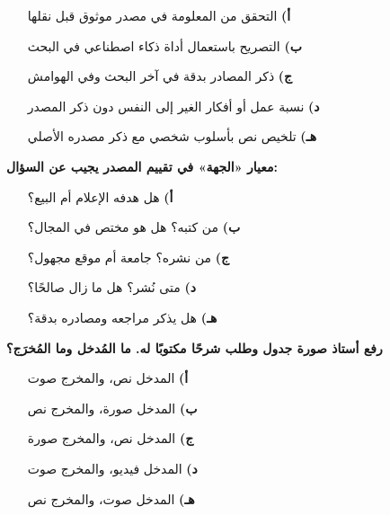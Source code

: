 \documentclass[11pt,a4paper]{article}
\begin{document}
\begin{multicols}{2}
\begin{minipage}{\linewidth}
\begin{itemize}[leftmargin=0.95cm, labelsep=4pt, itemsep=0pt, topsep=2pt, parsep=0pt]
  \item[\textbf{أ)}] التحقق من المعلومة في مصدر موثوق قبل نقلها
  \item[\textbf{ب)}] التصريح باستعمال أداة ذكاء اصطناعي في البحث
  \item[\textbf{ج)}] ذكر المصادر بدقة في آخر البحث وفي الهوامش
  \item[\textbf{د)}] نسبة عمل أو أفكار الغير إلى النفس دون ذكر المصدر
  \item[\textbf{هـ)}] تلخيص نص بأسلوب شخصي مع ذكر مصدره الأصلي
\end{itemize}
\end{minipage}\par\vspace{7pt plus 4pt}
\noindent\begin{minipage}{\linewidth}
\hangindent=0.7cm\textbf{معيار «الجهة» في تقييم المصدر يجيب عن السؤال:}
\begin{itemize}[leftmargin=0.95cm, labelsep=4pt, itemsep=0pt, topsep=2pt, parsep=0pt]
  \item[\textbf{أ)}] هل هدفه الإعلام أم البيع؟
  \item[\textbf{ب)}] من كتبه؟ هل هو مختص في المجال؟
  \item[\textbf{ج)}] من نشره؟ جامعة أم موقع مجهول؟
  \item[\textbf{د)}] متى نُشر؟ هل ما زال صالحًا؟
  \item[\textbf{هـ)}] هل يذكر مراجعه ومصادره بدقة؟
\end{itemize}
\end{minipage}\par\vspace{7pt plus 4pt}
\noindent\begin{minipage}{\linewidth}
\hangindent=0.7cm\textbf{رفع أستاذ صورة جدول وطلب شرحًا مكتوبًا له. ما المُدخل وما المُخرَج؟}
\begin{itemize}[leftmargin=0.95cm, labelsep=4pt, itemsep=0pt, topsep=2pt, parsep=0pt]
  \item[\textbf{أ)}] المدخل نص، والمخرج صوت
  \item[\textbf{ب)}] المدخل صورة، والمخرج نص
  \item[\textbf{ج)}] المدخل نص، والمخرج صورة
  \item[\textbf{د)}] المدخل فيديو، والمخرج صوت
  \item[\textbf{هـ)}] المدخل صوت، والمخرج نص
\end{itemize}
\end{minipage}\par\vspace{7pt plus 4pt}

\end{multicols}
\end{document}
